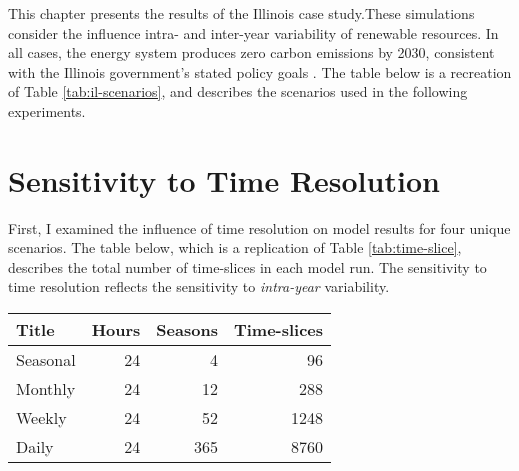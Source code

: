 This chapter presents the results of the Illinois case study.These simulations
consider the influence intra- and inter-year variability of renewable resources.
In all cases, the energy system produces zero carbon emissions by 2030,
consistent with the Illinois government's stated policy goals
\cite{harmon_climate_2021,office_of_governor_jb_pritzker_gov_2021}. The table
below is a recreation of Table \ref{tab:il-scenarios}, and describes the
scenarios used in the following experiments.

\begin{table}[H]
  \centering
\end{table}


\section{Sensitivity to Time Resolution}
\label{section:time_res}

First, I examined the influence of time resolution on model results for four
unique scenarios. The table below, which is a replication of  Table \ref{tab:time-slice},
describes the total number of time-slices in each model run.
The sensitivity to time resolution reflects the sensitivity to \textit{intra-year}
variability.

\begin{table}[H]
  \centering
  \begin{tabular}{lrrr}
    \toprule
    Title & Hours & Seasons & Time-slices \\
    \midrule
    Seasonal & 24 & 4 & 96\\
    Monthly & 24 & 12 & 288\\
    Weekly & 24 & 52 & 1248\\
    Daily & 24 & 365 & 8760\\
    \bottomrule
  \end{tabular}
\end{table}


